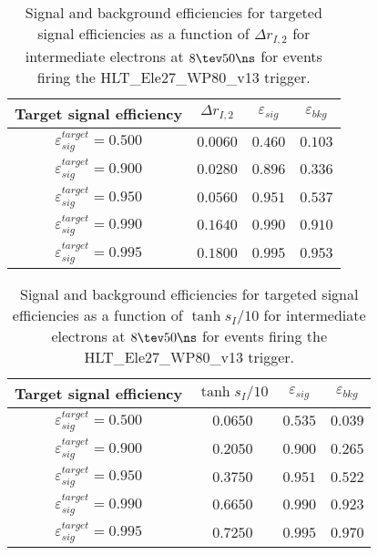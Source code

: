 \clearpage

\begin{table}[!bht]
  \begin{center}
    \begin{tabular}{cccc}
      \hline
      Target signal efficiency & $\Delta r_{I,2}$ & $\varepsilon_{sig}$ & $\varepsilon_{bkg}$ \\ 
      \hline
      $\varepsilon_{sig}^{target} = 0.500$ & $  0.0060$ & $0.460$ & $0.103$ \\
      $\varepsilon_{sig}^{target} = 0.900$ & $  0.0280$ & $0.896$ & $0.336$ \\
      $\varepsilon_{sig}^{target} = 0.950$ & $  0.0560$ & $0.951$ & $0.537$ \\
      $\varepsilon_{sig}^{target} = 0.990$ & $  0.1640$ & $0.990$ & $0.910$ \\
      $\varepsilon_{sig}^{target} = 0.995$ & $  0.1800$ & $0.995$ & $0.953$ \\
      \hline
    \end{tabular}
    \caption{Signal and background efficiencies for targeted signal efficiencies as a function of $\Delta r_{I,2}$ for intermediate electrons at $8\tev 50\ns$ for events firing the HLT\_Ele27\_WP80\_v13 trigger.}
    \label{tab:eff_rej_r2I_beam_8_50_trigger_27_I}
  \end{center}
\end{table}

\clearpage

\begin{table}[!bht]
  \begin{center}
    \begin{tabular}{cccc}
      \hline
      Target signal efficiency & $\tanh{s_I/10}$ & $\varepsilon_{sig}$ & $\varepsilon_{bkg}$ \\ 
      \hline
      $\varepsilon_{sig}^{target} = 0.500$ & $  0.0650$ & $0.535$ & $0.039$ \\
      $\varepsilon_{sig}^{target} = 0.900$ & $  0.2050$ & $0.900$ & $0.265$ \\
      $\varepsilon_{sig}^{target} = 0.950$ & $  0.3750$ & $0.951$ & $0.522$ \\
      $\varepsilon_{sig}^{target} = 0.990$ & $  0.6650$ & $0.990$ & $0.923$ \\
      $\varepsilon_{sig}^{target} = 0.995$ & $  0.7250$ & $0.995$ & $0.970$ \\
      \hline
    \end{tabular}
    \caption{Signal and background efficiencies for targeted signal efficiencies as a function of $\tanh{s_I/10}$ for intermediate electrons at $8\tev 50\ns$ for events firing the HLT\_Ele27\_WP80\_v13 trigger.}
    \label{tab:eff_rej_sI_beam_8_50_trigger_27_I}
  \end{center}
\end{table}

